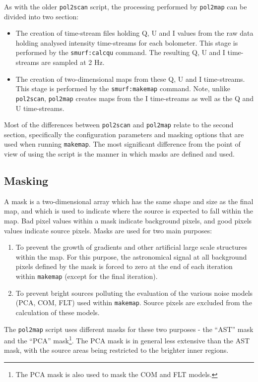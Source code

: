 \documentclass[twoside,11pt]{starlink}
\begin{document}
As with the older \texttt{pol2scan} script, the processing performed by
\texttt{pol2map} can be divided into two section:

\begin{itemize}
\item The creation of time-stream files holding Q, U and I values from
the raw data holding analysed intensity time-streams for each bolometer.
This stage is performed by the \texttt{smurf:calcqu} command. The
resulting Q, U and I time-streams are sampled at 2 Hz.
\item The creation of two-dimensional maps from these Q, U and I
time-streams. This stage is performed by the \texttt{smurf:makemap} command.
Note, unlike \texttt{pol2scan}, \texttt{pol2map} creates maps from the I
time-streams as well as the Q and U time-streams.
\end{itemize}

Most of the differences between \texttt{pol2scan} and \texttt{pol2map}
relate to the second section, specifically the configuration parameters
and masking options that are used when running \texttt{makemap}. The most
significant difference from the point of view of using the script is the manner
in which masks are defined and used.

\subsection{Masking}
A mask is a two-dimensional array which has the same shape and size as
the final map, and which is used to indicate where the source is expected
to fall within the map. Bad pixel values within a mask indicate
background pixels, and good pixels values indicate source pixels. Masks
are used for two main purposes:

\begin{enumerate}
\item To prevent the growth of gradients and other artificial large scale
structures within the map. For this purpose, the astronomical signal at
all background pixels defined by the mask is forced to zero at
the end of each iteration within \texttt{makemap} (except for the final
iteration).
\item To prevent bright sources polluting the evaluation of the various
noise models (PCA, COM, FLT) used within \texttt{makemap}. Source pixels
are excluded from the calculation of these models.
\end{enumerate}

The \texttt{pol2map} script uses different masks for these two purposes -
the ``AST'' mask and the ``PCA'' mask\footnote{The PCA mask is also used
to mask the COM and FLT models.}. The PCA mask is in general less
extensive than the AST mask, with the source areas being restricted to
the brighter inner regions.
\end{document}

